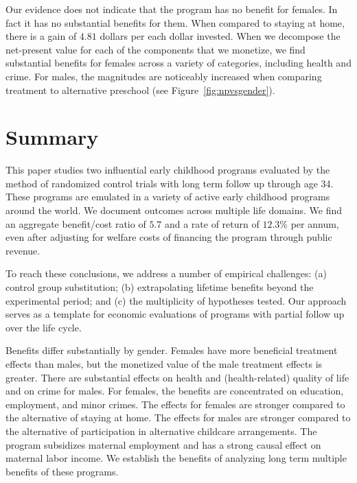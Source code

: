Our evidence does not indicate that the program has no benefit for females. In fact it has no substantial benefits for them. When compared to staying at home, there is a gain of $4.81$ dollars per each dollar invested. When we decompose the net-present value for each of the components that we monetize, we find substantial benefits for females across a variety of categories, including health and crime. For males, the magnitudes are noticeably increased when comparing treatment to alternative preschool (see Figure~\ref{fig:npvsgender}).

\section{Summary} \label{section:conclusion}

This paper studies two influential early childhood programs evaluated by the method of randomized control trials with long term follow up through age 34. These programs are emulated in a variety of active early childhood programs around the world. We document outcomes across multiple life domains. We find an aggregate benefit/cost ratio of $5.7$ and a rate of return of $12.3\%$ per annum, even after adjusting for welfare costs of financing the program through public revenue.

To reach these conclusions, we address a number of empirical challenges: (a) control group substitution; (b) extrapolating lifetime benefits beyond the experimental period; and (c) the multiplicity of hypotheses tested. Our approach serves as a template for economic evaluations of programs with partial follow up over the life cycle.

Benefits differ substantially by gender. Females have more beneficial treatment effects than males, but the monetized value of the male treatment effects is greater. There are substantial effects on health and (health-related) quality of life and on crime for males. For females, the benefits are concentrated on education, employment, and minor crimes. The effects for females are stronger compared to the alternative of staying at home. The effects for males are stronger compared to the alternative of participation in alternative childcare arrangements. The program subsidizes maternal employment and has a strong causal effect on maternal labor income. We establish the benefits of analyzing long term multiple benefits of these programs.

\singlespace



 